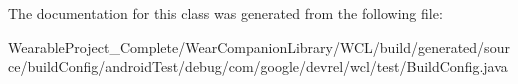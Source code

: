 The documentation for this class was generated from the following file\+:\begin{DoxyCompactItemize}
\item 
Wearable\+Project\+\_\+\+Complete/\+Wear\+Companion\+Library/\+W\+C\+L/build/generated/source/build\+Config/android\+Test/debug/com/google/devrel/wcl/test/Build\+Config.\+java\end{DoxyCompactItemize}
